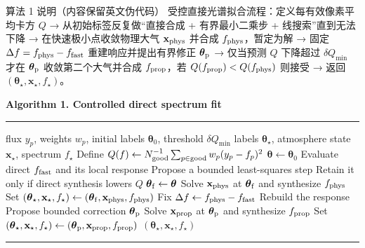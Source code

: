 \begin{notebox}{算法 1 说明（内容保留英文伪代码）}
受控直接光谱拟合流程：定义每有效像素平均卡方 $Q$ → 从初始标签反复做“直接合成 + 有界最小二乘步 + 线搜索”直到无法下降 → 在快速极小点收敛物理大气 $\mathbf{x}_{\rm phys}$ 并合成 $f_{\rm phys}$，暂定为解 → 固定 $\Delta f=f_{\rm phys}-f_{\rm fast}$ 重建响应并提出有界修正 $\boldsymbol{\theta}_{\rm p}$ → 仅当预测 $Q$ 下降超过 $\delta Q_{\min}$ 才在 $\boldsymbol{\theta}_{\rm p}$ 收敛第二个大气并合成 $f_{\rm prop}$，若 $Q(f_{\rm prop})<Q(f_{\rm phys})$ 则接受 → 返回 $(\boldsymbol{\theta}_\star,\mathbf{x}_\star,f_\star)$。
\end{notebox}

\begin{table}[t]
\centering
\begin{minipage}{\columnwidth}
\centering
\textbf{Algorithm 1. Controlled direct spectrum fit}\par
\vspace{2pt}
\noindent\rule{\columnwidth}{0.5pt}
\vspace{2pt}
\begin{algorithmic}[1]
\Require flux $y_p$, weights $w_p$, initial labels $\boldsymbol{\theta}_0$,
threshold $\delta Q_{\min}$
\Ensure labels $\boldsymbol{\theta}_\star$, atmosphere state $\mathbf{x}_\star$,
spectrum $f_\star$
\State Define $Q(f)\gets N_{\rm good}^{-1}\sum_{p\in{\rm good}}w_p(y_p-f_p)^2$
\State $\boldsymbol{\theta}\gets\boldsymbol{\theta}_0$
\Repeat
  \State Evaluate direct $f_{\rm fast}$ and its local response
  \State Propose a bounded least-squares step
  \State Retain it only if direct synthesis lowers $Q$
\State $\boldsymbol{\theta}_{\rm f}\gets\boldsymbol{\theta}$
\State Solve $\mathbf{x}_{\rm phys}$ at $\boldsymbol{\theta}_{\rm f}$ and synthesize $f_{\rm phys}$
\State Set $(\boldsymbol{\theta}_\star,\mathbf{x}_\star,f_\star)
  \gets(\boldsymbol{\theta}_{\rm f},\mathbf{x}_{\rm phys},f_{\rm phys})$
\State Fix $\Delta f\gets f_{\rm phys}-f_{\rm fast}$
\State Rebuild the response
\State Propose bounded correction $\boldsymbol{\theta}_{\rm p}$
  \State Solve $\mathbf{x}_{\rm prop}$ at $\boldsymbol{\theta}_{\rm p}$ and synthesize $f_{\rm prop}$
    \State Set $(\boldsymbol{\theta}_\star,\mathbf{x}_\star,f_\star)
      \gets(\boldsymbol{\theta}_{\rm p},\mathbf{x}_{\rm prop},f_{\rm prop})$
  \EndIf
\EndIf
\State \Return $(\boldsymbol{\theta}_\star,\mathbf{x}_\star,f_\star)$
\end{algorithmic}
\vspace{2pt}
\noindent\rule{\columnwidth}{0.5pt}
\end{minipage}
\end{table}

